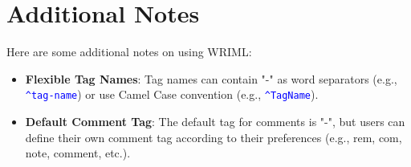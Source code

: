 \documentclass{article}
\begin{document}
\section{Additional Notes}
Here are some additional notes on using WRIML:

\begin{itemize}
    \item \textbf{Flexible Tag Names}: Tag names can contain "-" as word separators (e.g., \textcolor{blue}{\texttt{\textasciicircum tag-name}}) or use Camel Case convention (e.g., \textcolor{blue}{\texttt{\textasciicircum TagName}}).
    \item \textbf{Default Comment Tag}: The default tag for comments is "-", but users can define their own comment tag according to their preferences (e.g., rem, com, note, comment, etc.).
\end{itemize}
\end{document}
